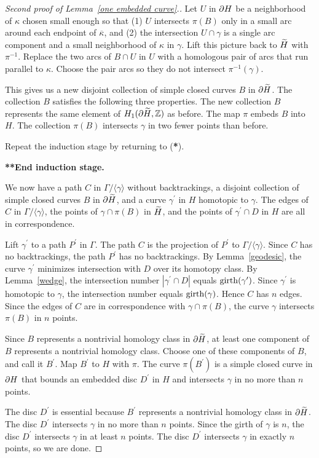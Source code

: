 \begin{proof}[Second proof of Lemma~\ref{one embedded curve}.]
Let $U$ in $\partial H$ be a neighborhood of $\kappa$ chosen small enough so that (1) $U$ intersects $\pi(B)$ only in a small arc around each endpoint of $\overline{\kappa}$, and (2) the intersection $U\cap\gamma$ is a single arc component and a small neighborhood of $\kappa$ in $\gamma$.  Lift this picture back to $\widetilde{H}$ with $\pi^{-1}$.  Replace the two arcs of $B\cap U$ in $U$ with a homologous pair of arcs that run parallel to $\kappa$. Choose the pair arcs so they do not intersect $\pi^{-1}(\gamma)$.

This gives us a new disjoint collection of simple closed curves $B$ in $\partial \widetilde{H}$.  The collection $B$ satisfies the following three properties.  The new collection $B$ represents the same element of $H_{1}(\partial \widetilde{H}, {\mathbb Z})$ as before.  The map $\pi$ embeds $B$ into $H$.  The collection $\pi(B)$ intersects $\gamma$ in two fewer points than before.

Repeat the induction stage by returning to (\textbf{*}).

\textbf{**End induction stage.}

We now have a path $C$ in $\Gamma/\langle\gamma\rangle$ without backtrackings, a disjoint collection of simple closed curves $B$ in $\partial\widetilde{H}$, and a curve $\gamma^{\prime}$ in $H$ homotopic to $\gamma$.  The edges of $C$ in $\Gamma/\langle\gamma\rangle$, the points of $\gamma\cap\pi(B)$ in $\widetilde{H}$, and the points of $\gamma^{\prime}\cap D$ in $H$ are all in correspondence.

Lift $\gamma^{\prime}$ to a path $P^{\prime}$ in $\Gamma$.  The path $C$ is the projection of $P^{\prime}$ to $\Gamma/\langle\gamma\rangle$.  Since $C$ has no backtrackings, the path $P^{\prime}$ has no backtrackings.  By Lemma~\ref{geodesic}, the curve $\gamma^{\prime}$ minimizes intersection with $D$ over its homotopy class.  By Lemma~\ref{wedge}, the intersection number $|\gamma^{\prime}\cap D|$ equals $\operatorname{girth}(\gamma^{\prime})$.  Since $\gamma^{\prime}$ is homotopic to $\gamma$, the intersection number equals $\operatorname{girth}(\gamma)$.  Hence $C$ has $n$ edges.  Since the edges of $C$ are in correspondence with $\gamma\cap\pi(B)$, the curve $\gamma$ intersects $\pi(B)$ in $n$ points.

Since $B$ represents a nontrivial homology class in $\partial \widetilde{H}$, at least one component of $B$ represents a nontrivial homology class.  Choose one of these components of $B$, and call it $B^{\prime}$.  Map $B^{\prime}$ to $H$ with $\pi$.  The curve $\pi(B^\prime)$ is a simple closed curve in $\partial H$ that bounds an embedded disc $D^\prime$ in $H$ and intersects $\gamma$ in no more than $n$ points.

The disc $D^{\prime}$ is essential because $B^{\prime}$ represents a nontrivial homology class in $\partial \widetilde{H}$.  The disc $D^\prime$ intersects $\gamma$ in no more than $n$ points.  Since the girth of $\gamma$ is $n$, the disc $D^\prime$ intersects $\gamma$ in at least $n$ points.  The disc $D^{\prime}$ intersects $\gamma$ in exactly $n$ points, so we are done.
\end{proof}

